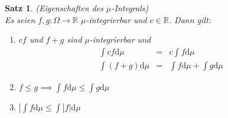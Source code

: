 \documentclass[a4paper,11pt]{book}
\newcommand{\R}{{\mathbb R}}
\def\folgt{\ensuremath{\implies}}
\newtheorem{Sa}{Satz}[chapter]
\theoremstyle{nonumberplain}
\begin{document}
\begin{Sa}(Eigenschaften des $\mu$-Integrals)\\
Es seien $f,g:\Omega\to\R$ $\mu$-integrierbar und $c\in\R$. Dann gilt:
\begin{enumerate}
\item[a)] $cf$ und $f+g$ sind $\mu$-integrierbar und 
\begin{eqnarray*}
\int cf\mbox{d}\mu&=&c\int f\mbox{d}\mu\\
\int(f+g)\mbox{d}\mu&=&\int f\mbox{d}\mu + \int g\mbox{d}\mu
\end{eqnarray*}
\item[b)] $f\le g\folgt \int f\mbox{d}\mu\le\int g\mbox{d}\mu$
\item[c)] $|\int f\mbox{d}\mu\le\int|f|\mbox{d}\mu$
\end{enumerate}
\end{Sa}
\end{document}
